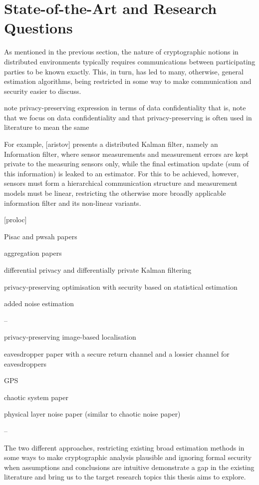 \section{State-of-the-Art and Research Questions}

As mentioned in the previous section, the nature of cryptographic notions in distributed environments typically requires communications between participating parties to be known exactly. This, in turn, has led to many, otherwise, general estimation algorithms, being restricted in some way to make communication and security easier to discuss.

note privacy-preserving expression in terms of data confidentiality
that is, note that we focus on data confidentiality and that privacy-preserving is often used in literature to mean the same

For example, [aristov] presents a distributed Kalman filter, namely an Information filter, where sensor measurements and measurement errors are kept private to the measuring sensors only, while the final estimation update (sum of this information) is leaked to an estimator. For this to be achieved, however, sensors must form a hierarchical communication structure and measurement models must be linear, restricting the otherwise more broadly applicable information filter and its non-linear variants.

[proloc]

Pisac and pwsah papers

aggregation papers

differential privacy and differentially private Kalman filtering

privacy-preserving optimisation with security based on statistical estimation

added noise estimation

--

privacy-preserving image-based localisation

eavesdropper paper with a secure return channel and a lossier channel for eavesdroppers

GPS

chaotic system paper

physical layer noise paper (similar to chaotic noise paper)

--


The two different approaches, restricting existing broad estimation methods in some ways to make cryptographic analysis plausible and ignoring formal security when assumptions and conclusions are intuitive demonstrate a gap in the existing literature and bring us to the target research topics this thesis aims to explore.

